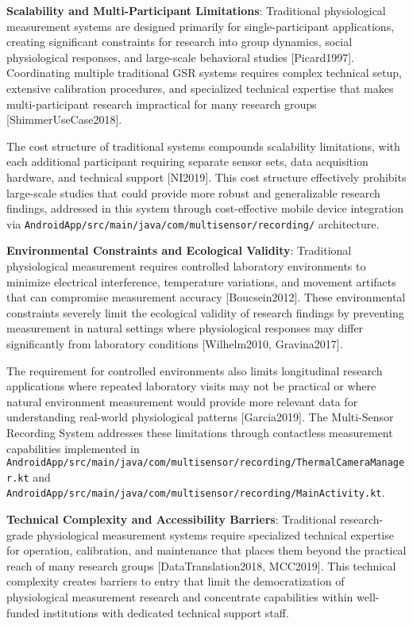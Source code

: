 \documentclass[11pt,a4paper]{article}
\begin{document}
\textbf{Scalability and Multi-Participant Limitations}: Traditional physiological measurement systems are designed primarily
for single-participant applications, creating significant constraints for research
into group dynamics, social
physiological responses, and large-scale behavioral studies [Picard1997].
Coordinating multiple traditional GSR systems
requires complex technical setup, extensive calibration procedures, and specialized
technical expertise that makes
multi-participant research impractical for many research groups [ShimmerUseCase2018].

The cost structure of traditional systems compounds scalability limitations, with
each additional participant requiring
separate sensor sets, data acquisition hardware, and technical support [NI2019].
This cost structure effectively
prohibits large-scale studies that could provide more robust and generalizable
research findings, addressed in this
system through cost-effective mobile device integration via
\texttt{AndroidApp/src/main/java/com/multisensor/recording/}
architecture.

\textbf{Environmental Constraints and Ecological Validity}: Traditional physiological measurement requires controlled
laboratory environments to minimize electrical interference, temperature variations,
and movement artifacts that can
compromise measurement accuracy [Boucsein2012].  These environmental constraints
severely limit the ecological validity
of research findings by preventing measurement in natural settings where
physiological responses may differ
significantly from laboratory conditions [Wilhelm2010, Gravina2017].

The requirement for controlled environments also limits longitudinal research
applications where repeated laboratory
visits may not be practical or where natural environment measurement would provide
more relevant data for understanding
real-world physiological patterns [Garcia2019].  The Multi-Sensor Recording System
addresses these limitations through
contactless measurement capabilities implemented in
\texttt{AndroidApp/src/main/java/com/multisensor/recording/ThermalCameraManager.kt} and
\texttt{AndroidApp/src/main/java/com/multisensor/recording/MainActivity.kt}.

\textbf{Technical Complexity and Accessibility Barriers}: Traditional research-grade physiological measurement systems
require specialized technical expertise for operation, calibration, and maintenance
that places them beyond the
practical reach of many research groups [DataTranslation2018, MCC2019].  This
technical complexity creates barriers to
entry that limit the democratization of physiological measurement research and
concentrate capabilities within
well-funded institutions with dedicated technical support staff.
\end{document}
